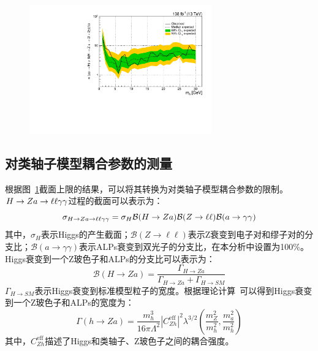 \begin{figure}[htbp]
  \begin{center}
		\includegraphics[width=0.7\textwidth]{Thesis (Version 2246)/figures/chapter04/ALP_xs_UpperLimit.pdf}
    \label{fig:xs}
\end{center}
\end{figure}

\subsection{对类轴子模型耦合参数的测量}

根据图~\ref{fig:xs}截面上限的结果，可以将其转换为对类轴子模型耦合参数的限制。$H\to Za\to\ell\ell\gamma\gamma$过程的截面可以表示为：
\begin{equation}
    \sigma_{H\to Za\to\ell\ell\gamma\gamma} = \sigma_{H}\mathcal{B}(H\to Za)\mathcal{B}(Z\to\ell\ell)\mathcal{B}(a\to\gamma\gamma)
\end{equation}
其中，$\sigma_{H}$表示Higgs的产生截面；$\mathcal{B}(Z\to\ell\ell)$表示Z衰变到电子对和缪子对的分支比；$\mathcal{B}(a\to\gamma\gamma)$表示ALPs衰变到双光子的分支比，在本分析中设置为100\%。Higgs衰变到一个Z玻色子和ALPs的分支比可以表示为：
\begin{equation}
    \mathcal{B}(H\to Za)=\frac{\Gamma_{H\to Za}}{\Gamma_{H\to Za}+\Gamma_{H\to SM}}
\end{equation}
$\Gamma_{H\to SM}$表示Higgs衰变到标准模型粒子的宽度。根据理论计算~\cite{Bauer:2017ris}可以得到Higgs衰变到一个Z玻色子和ALPs的宽度为：
\begin{equation}
    \Gamma(h \rightarrow Z a)=\frac{m_{h}^{3}}{16 \pi \Lambda^{2}}\left|C_{Z h}^{\mathrm{eff}}\right|^{2} \lambda^{3 / 2}\left(\frac{m_{Z}^{2}}{m_{h}^{2}}, \frac{m_{a}^{2}}{m_{h}^{2}}\right)
\end{equation}
其中，$C_{Z h}^{\mathrm{eff}}$描述了Higgs和类轴子、Z玻色子之间的耦合强度。

